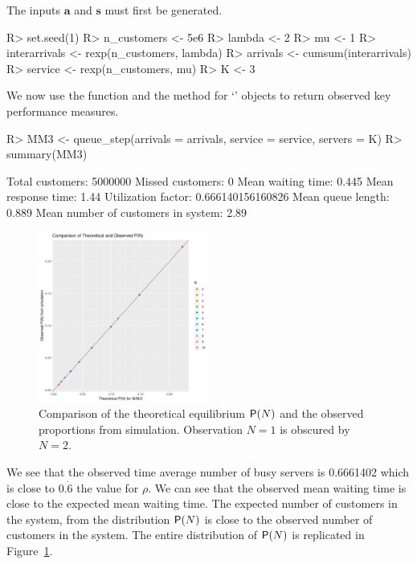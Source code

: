 \documentclass[article]{jss}
\begin{document}
The inputs $\mathbf{a}$ and $\mathbf{s}$ must first be generated. 
%
\begin{CodeChunk}
\begin{Sinput}
R> set.seed(1) 
R> n_customers <- 5e6
R> lambda <- 2
R> mu <- 1
R> interarrivals <- rexp(n_customers, lambda)
R> arrivals <- cumsum(interarrivals)
R> service <- rexp(n_customers, mu)
R> K <- 3
\end{Sinput}
\end{CodeChunk}
%
We now use the  function and the 
method for `' objects to return observed key
performance measures.
%
\begin{CodeChunk}
\begin{Sinput}
R> MM3 <- queue_step(arrivals = arrivals, service = service, servers = K)
R> summary(MM3)
\end{Sinput}
\begin{Soutput}
Total customers:
 5000000
Missed customers:
 0
Mean waiting time:
 0.445
Mean response time:
 1.44
Utilization factor:
 0.666140156160826
Mean queue length:
 0.889
Mean number of customers in system:
 2.89
\end{Soutput}
\end{CodeChunk}
%
\begin{figure}[t!]
  \centering
  \includegraphics[width = 0.5\textwidth, trim = 0 5 0 5, clip]{theoretical.pdf}
  \caption{Comparison of the theoretical equilibrium $\mathsf{P}(N)$ and
    the observed proportions from simulation. Observation $N = 1$ is
    obscured by $N = 2$.}
  \label{fig:theoretical}
\end{figure}

We see that the observed time average number of busy servers is 0.6661402 which is close to $0.\dot{6}$ the value for $\rho$. We can see that the observed mean waiting time is close to the expected mean waiting time. The expected number of customers in the system, from the distribution $\mathsf{P}(N)$ is close to the observed number of customers in the system. The entire distribution of $\mathsf{P}(N)$ is replicated in Figure~\ref{fig:theoretical}. 
\end{document}
